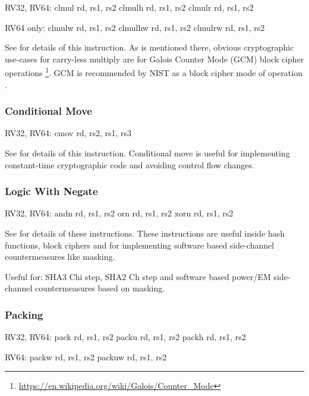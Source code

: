 \begin{cryptobitmanipisa}
RV32, RV64:
    clmul rd, rs1, rs2
    clmulh rd, rs1, rs2
    clmulr rd, rs1, rs2

RV64 only:
    clmulw rd, rs1, rs2
    clmulhw rd, rs1, rs2
    clmulrw rd, rs1, rs2
\end{cryptobitmanipisa}

See \cite[Section 2.6]{riscv:bitmanip:draft} for details of
this instruction.
As is mentioned there, obvious cryptographic use-cases for carry-less
multiply are for Galois Counter Mode (GCM) block cipher operations
\footnote{\url{https://en.wikipedia.org/wiki/Galois/Counter_Mode}}.
GCM is recommended by NIST as a block cipher mode of operation
\cite{nist:gcm}.

\subsubsection{Conditional Move}

\begin{cryptobitmanipisa}
RV32, RV64:
    cmov rd, rs2, rs1, rs3
\end{cryptobitmanipisa}

See \cite[Section 2.9.2]{riscv:bitmanip:draft} for details of
this instruction.
Conditional move is useful for implementing constant-time cryptographic
code and avoiding control flow changes.

\subsubsection{Logic With Negate}

\begin{cryptobitmanipisa}
RV32, RV64:
    andn rd, rs1, rs2
     orn rd, rs1, rs2
    xorn rd, rs1, rs2
\end{cryptobitmanipisa}

See \cite[Section 2.1.3]{riscv:bitmanip:draft} for details of
these instructions.
These instructions are useful inside hash functions, block ciphers and
for implementing software based side-channel countermeasures like masking.

Useful for:
SHA3 Chi step,
SHA2 Ch step
and
software based power/EM side-channel countermeasures based on masking.

\subsubsection{Packing}

\begin{cryptobitmanipisa}
RV32, RV64: 
    pack   rd, rs1, rs2
    packu  rd, rs1, rs2
    packh  rd, rs1, rs2

RV64: 
    packw  rd, rs1, rs2
    packuw rd, rs1, rs2
\end{cryptobitmanipisa}

